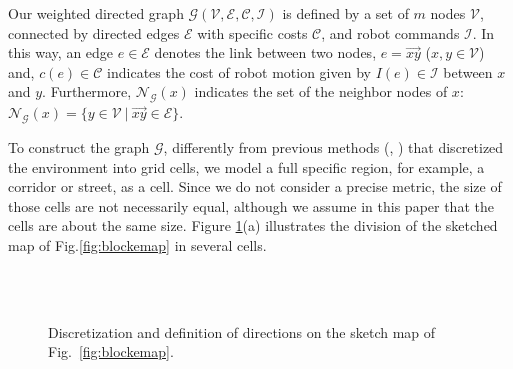 \documentclass[smallcondensed]{svjour3}
\begin{document}
Our weighted directed graph $\mathcal{G}(\mathcal{V},\mathcal{E},\mathcal{C},\mathcal{I})$ is defined by a set of $m$ nodes $\mathcal{V}$, connected by directed edges $\mathcal{E}$ with specific costs $\mathcal{C}$, and robot commands $\mathcal{I}$. In this way, an edge $e \in \mathcal{E}$ denotes the link between two nodes, $e=\overrightarrow{xy}$ ($x,y \in \mathcal{V}$) and, $c(e) \in \mathcal{C}$ indicates the cost of robot motion given by $I(e) \in \mathcal{I}$ between $x$ and $y$. Furthermore, $\mathcal{N}_{\mathcal{G}}(x)$ indicates the set of the neighbor nodes of $x$: $ \mathcal{N}_{\mathcal{G}}(x) = \{ y \in \mathcal{V} ~\big|~ \overrightarrow{xy} \in \mathcal{E}\}$.

To construct the graph $\mathcal{G}$, differently from previous methods (\cite{Yun2013}, \cite{Durham2012}) that discretized the environment into grid cells, we model a full specific region, for example, a corridor or street, as a cell. Since we do not consider a precise metric, the size of those cells are not necessarily equal, although we assume in this paper that the cells are about the same size. Figure \ref{fig:samplemap}(a) illustrates the division of the sketched  map of Fig.\ref{fig:blockemap} in several cells. 

\begin{figure}[h]
\centering
    \\
\\   
    \caption{Discretization and definition of directions on the sketch map of Fig.~\ref{fig:blockemap}.}
    \label{fig:samplemap}
\end{figure}
 
\end{document}
